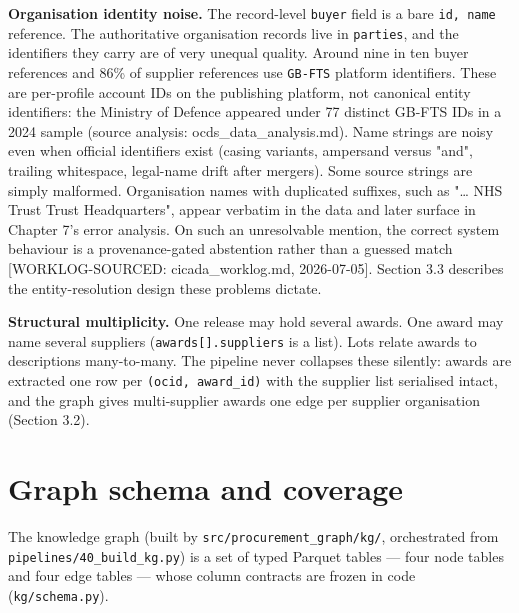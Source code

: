 \documentclass[10pt]{article} %
\begin{document}
\textbf{Organisation identity noise.} The record-level \texttt{buyer} field is a bare \texttt{{id, name}} reference. The authoritative organisation records live in \texttt{parties}, and the identifiers they carry are of very unequal quality. Around nine in ten buyer references and 86\% of supplier references use \texttt{GB-FTS} platform identifiers. These are per-profile account IDs on the publishing platform, not canonical entity identifiers: the Ministry of Defence appeared under 77 distinct GB-FTS IDs in a 2024 sample (source analysis: ocds\_data\_analysis.md). Name strings are noisy even when official identifiers exist (casing variants, ampersand versus "and", trailing whitespace, legal-name drift after mergers). Some source strings are simply malformed. Organisation names with duplicated suffixes, such as "\ldots{} NHS Trust Trust Headquarters", appear verbatim in the data and later surface in Chapter 7's error analysis. On such an unresolvable mention, the correct system behaviour is a provenance-gated abstention rather than a guessed match [WORKLOG-SOURCED: cicada\_worklog.md, 2026-07-05]. Section 3.3 describes the entity-resolution design these problems dictate.

\textbf{Structural multiplicity.} One release may hold several awards. One award may name several suppliers (\texttt{awards[].suppliers} is a list). Lots relate awards to descriptions many-to-many. The pipeline never collapses these silently: awards are extracted one row per \texttt{(ocid, award\_id)} with the supplier list serialised intact, and the graph gives multi-supplier awards one edge per supplier organisation (Section 3.2).

\section{Graph schema and coverage}\label{sec:graph-schema-and-coverage}

The knowledge graph (built by \texttt{src/procurement\_graph/kg/}, orchestrated from \texttt{pipelines/40\_build\_kg.py}) is a set of typed Parquet tables --- four node tables and four edge tables --- whose column contracts are frozen in code (\texttt{kg/schema.py}).
\end{document}
